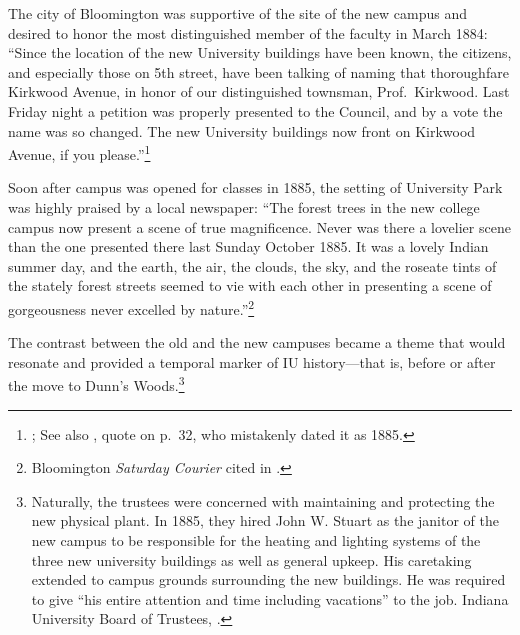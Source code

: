 \documentclass[
  american,
  letterpaper,
]{scrreprt}
\begin{document}
The city of Bloomington was supportive of the site of the new campus and
desired to honor the most distinguished member of the faculty in March
1884: ``Since the location of the new University buildings have been
known, the citizens, and especially those on 5th street, have been
talking of naming that thoroughfare Kirkwood Avenue, in honor of our
distinguished townsman, Prof.~Kirkwood. Last Friday night a petition was
properly presented to the Council, and by a vote the name was so
changed. The new University buildings now front on Kirkwood Avenue, if
you please.''\footnote{; See also
  , quote on p.~32, who mistakenly dated it as
  1885.}

Soon after campus was opened for classes in 1885, the setting of
University Park was highly praised by a local newspaper: ``The forest
trees in the new college campus now present a scene of true
magnificence. Never was there a lovelier scene than the one presented
there last Sunday October 1885. It was a lovely Indian summer day, and
the earth, the air, the clouds, the sky, and the roseate tints of the
stately forest streets seemed to vie with each other in presenting a
scene of gorgeousness never excelled by nature.''\footnote{Bloomington
  \emph{Saturday Courier} cited in .}

The contrast between the old and the new campuses became a theme that
would resonate and provided a temporal marker of IU history---that is,
before or after the move to Dunn's Woods.\footnote{Naturally, the
  trustees were concerned with maintaining and protecting the new
  physical plant. In 1885, they hired John W. Stuart as the janitor of
  the new campus to be responsible for the heating and lighting systems
  of the three new university buildings as well as general upkeep. His
  caretaking extended to campus grounds surrounding the new buildings.
  He was required to give ``his entire attention and time including
  vacations'' to the job. Indiana University Board of Trustees,
  .}
\end{document}
